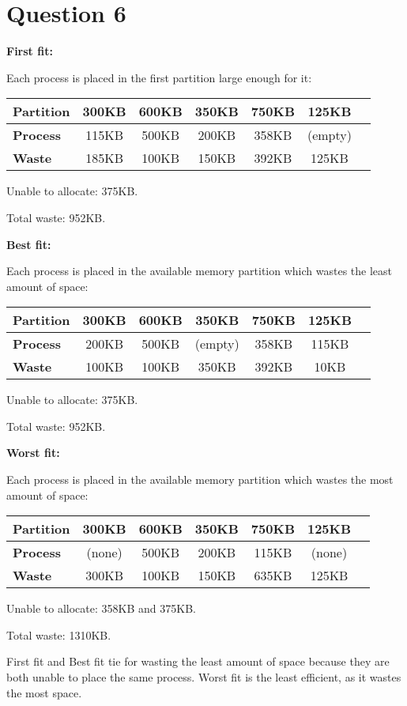 \documentclass[a4paper]{article}
\begin{document}
	\section{Question 6}
	\par \textbf{First fit:}
	\par Each process is placed in the first partition large enough for it:
	\begin{center}
		\begin{tabular}{|l|c|c|c|c|c|c|}
			\hline
			\textbf{Partition} & 300KB & 600KB & 350KB & 750KB & 125KB \\
			\hline
			\textbf{Process}   & 115KB & 500KB & 200KB & 358KB & (empty) \\
			\hline
			\textbf{Waste}     & 185KB & 100KB & 150KB & 392KB & 125KB \\
			\hline
		\end{tabular}
	\end{center}
	\par Unable to allocate: 375KB.
	\par Total waste: 952KB.
	\par \textbf{Best fit:}
	\par Each process is placed in the available memory partition which wastes
	the least amount of space:
	\begin{center}
		\begin{tabular}{|l|c|c|c|c|c|c|}
			\hline
			\textbf{Partition} & 300KB & 600KB & 350KB & 750KB & 125KB \\
			\hline
			\textbf{Process}   & 200KB & 500KB & (empty) & 358KB & 115KB \\
			\hline
			\textbf{Waste}     & 100KB & 100KB & 350KB & 392KB & 10KB \\
			\hline
		\end{tabular}
	\end{center}
	\par Unable to allocate: 375KB.
	\par Total waste: 952KB.
	\par \textbf{Worst fit:}
	\par Each process is placed in the available memory partition which wastes
	the most amount of space:
	\begin{center}
		\begin{tabular}{|l|c|c|c|c|c|c|}
			\hline
			\textbf{Partition} & 300KB & 600KB & 350KB & 750KB & 125KB \\
			\hline
			\textbf{Process}   & (none) & 500KB & 200KB & 115KB & (none) \\
			\hline
			\textbf{Waste}     & 300KB & 100KB & 150KB & 635KB & 125KB \\
			\hline
		\end{tabular}
	\end{center}
	\par Unable to allocate: 358KB and 375KB.
	\par Total waste: 1310KB.
	\par First fit and Best fit tie for wasting the least amount of space because
	they are both unable to place the same process.
	Worst fit is the least efficient, as it wastes the most space.
\end{document}
